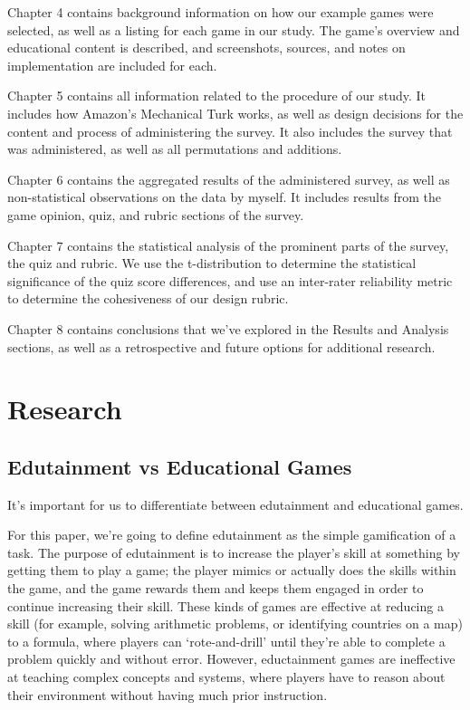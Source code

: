 \documentclass[12pt]{report}
\begin{document}
		Chapter 4 contains background information on how our example games were selected, as well as a listing for each game in our study. The game's overview and educational content is described, and screenshots, sources, and notes on implementation are included for each.

		Chapter 5 contains all information related to the procedure of our study. It includes how Amazon's Mechanical Turk works, as well as design decisions for the content and process of administering the survey. It also includes the survey that was administered, as well as all permutations and additions.

		Chapter 6 contains the aggregated results of the administered survey, as well as non-statistical observations on the data by myself. It includes results from the game opinion, quiz, and rubric sections of the survey.

		Chapter 7 contains the statistical analysis of the prominent parts of the survey, the quiz and rubric. We use the t-distribution to determine the statistical significance of the quiz score differences, and use an inter-rater reliability metric to determine the cohesiveness of our design rubric.

		Chapter 8 contains conclusions that we've explored in the Results and Analysis sections, as well as a retrospective and future options for additional research.

\chapter{Research}
	\section{Edutainment vs Educational Games}

		It's important for us to differentiate between edutainment and educational games. 

		For this paper, we're going to define edutainment as the simple gamification of a task. The purpose of edutainment is to increase the player's skill at something by getting them to play a game; the player mimics or actually does the skills within the game, and the game rewards them and keeps them engaged in order to continue increasing their skill. These kinds of games are effective at reducing a skill (for example, solving arithmetic problems, or identifying countries on a map) to a formula, where players can `rote-and-drill' until they're able to complete a problem quickly and without error. However, eductainment games are ineffective at teaching complex concepts and systems, where players have to reason about their environment without having much prior instruction. 
\end{document}
